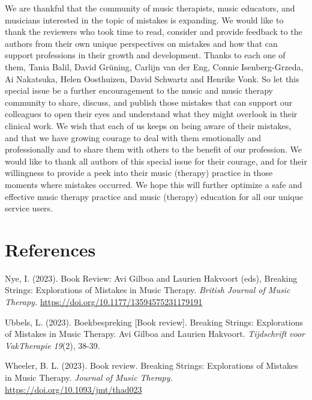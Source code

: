 \documentclass[authordate, empirical, issue]{jote-new-article}
\begin{document}
We are thankful that the community of music therapists, music educators, and musicians interested in the topic of mistakes is expanding. We would like to thank the reviewers who took time to read, consider and provide feedback to the authors from their own unique perspectives on mistakes and how that can support professions in their growth and development. Thanks to each one of them, Tania Balil, David Grüning, Carlijn van der Eng, Connie Isenberg-Grzeda, Ai Nakatsuka, Helen Oosthuizen, David Schwartz and Henrike Vonk. So let this special issue be a further encouragement to the music and music therapy community to share, discuss, and publish those mistakes that can support our colleagues to open their eyes and understand what they might overlook in their clinical work. We wish that each of us keeps on being aware of their mistakes, and that we have growing courage to deal with them emotionally and professionally and to share them with others to the benefit of our profession. We would like to thank all authors of this special issue for their courage, and for their willingness to provide a peek into their music (therapy) practice in those moments where mistakes occurred. We hope this will further optimize a safe and effective music therapy practice and music (therapy) education for all our unique service users.








\newpage
\section{References}



Nye, I. (2023). Book Review: Avi Gilboa and Laurien Hakvoort (eds), Breaking Strings: Explorations of Mistakes in Music Therapy. \emph{British Journal of Music Therapy. }\url{https://doi.org/10.1177/13594575231179191}



Ubbels, L. (2023). Boekbespreking [Book review]. Breaking Strings: Explorations of Mistakes in Music Therapy. Avi Gilboa and Laurien Hakvoort. \emph{Tijdschrift}\emph{ }\emph{voor}\emph{ }\emph{VakTherapie}\emph{ 19}(2), 38-39.



Wheeler, B. L. (2023). Book review. Breaking Strings: Explorations of Mistakes in Music Therapy. \emph{Journal of Music Therapy. }\url{https://doi.org/10.1093/jmt/thad023}
\end{document}
